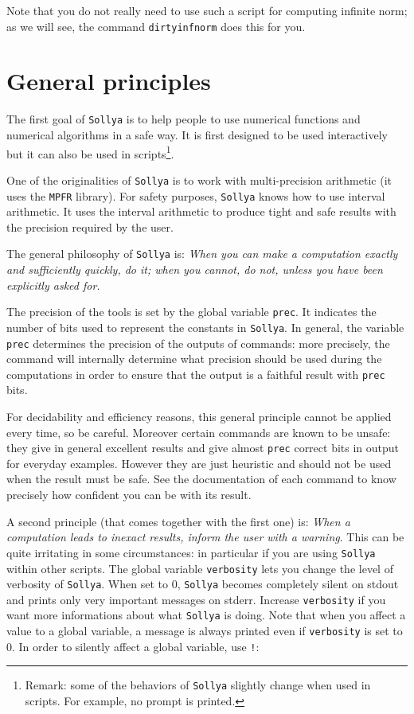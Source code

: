 \documentclass[a4paper]{article}
\newcommand{\com}[1]{\texttt{#1}}
\newcommand{\key}[1]{\texttt{#1}}
\newcommand{\sollya}{\texttt{Sollya}\xspace}
\begin{document}
Note that you do not really need to use such a script for computing infinite norm; as we will see, the command \com{dirtyinfnorm} does this for you.

\section{General principles}
The first goal of \sollya is to help people to use numerical functions and numerical algorithms in a safe way. It is first designed to be used interactively but it can also be used in scripts\footnote{Remark: some of the behaviors of \sollya slightly change when used in scripts. For example, no prompt is printed.}.

One of the originalities of \sollya is to work with multi-precision arithmetic (it uses the \texttt{MPFR} library). For safety purposes, \sollya knows how to use interval arithmetic. It uses the interval arithmetic to produce tight and safe results with the precision required by the user.

The general philosophy of \sollya is: \emph{When you can make a computation exactly and sufficiently quickly, do it; when you cannot, do not, unless you have been explicitly asked for.}

The precision of the tools is set by the global variable \key{prec}. It indicates the number of bits used to represent the constants in \sollya. In general, the variable \key{prec} determines the precision of the outputs of commands: more precisely, the command will internally determine what precision should be used during the computations in order to ensure that the output is a faithful result with \key{prec} bits.

For decidability and efficiency reasons, this general principle cannot be applied every time, so be careful. Moreover certain commands are known to be unsafe: they give in general excellent results and give almost \key{prec} correct bits in output for everyday examples. However they are just heuristic and should not be used when the result must be safe. See the documentation of each command to know precisely how confident you can be with its result.

A second principle (that comes together with the first one) is: \emph{When a computation leads to inexact results, inform the user with a warning}. This can be quite irritating in some circumstances: in particular if you are using \sollya within other scripts. The global variable \key{verbosity} lets you change the level of verbosity of \sollya. When set to $0$, \sollya becomes completely silent on stdout and prints only very important messages on stderr. Increase \key{verbosity} if you want more informations about what \sollya is doing. Note that when you affect a value to a global variable, a message is always printed even if \com{verbosity} is set to $0$. In order to silently affect a global variable, use \texttt{!}:
\end{document}

